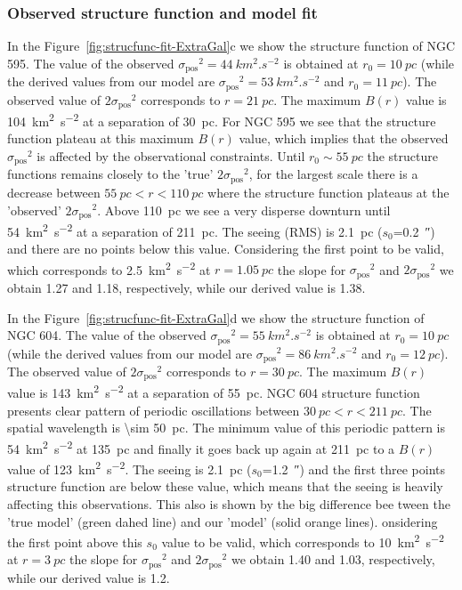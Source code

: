 \documentclass[fleqn,usenatbib, useAMS, a4paper]{mnras}
\newcommand\pos{\ensuremath{_{\mathrm{pos}}}}
\begin{document}
\subsubsection{Observed structure function and model fit}
\label{sec:observ-struct-funct-m33}

In the Figure~\ref{fig:strucfunc-fit-ExtraGal}c we show the structure function of NGC 595.
The value of the observed \(\sigma\pos^2 = \SI{44}{km^{2}.s^{-2}}\) is obtained at \(r_0 = \SI{10}{pc} \) (while the derived values from our model are \(\sigma\pos^2 = \SI{53}{km^{2}.s^{-2}}\) and \(r_0 = \SI{11}{pc} \)).
The observed value of \(2\sigma\pos^2\) corresponds to \(r = \SI{21}{pc} \).
The maximum \(B(r)\) value is \SI{104}{km^{2}.s^{-2}} at a separation of \SI{30}{pc}. 
For NGC 595 we see that the structure function plateau at this maximum \(B(r)\) value, which implies that the observed \(\sigma\pos^2\) is affected by the observational constraints.
Until \(r_0 \sim \SI{55}{pc} \) the structure functions remains closely to the 'true' \(2\sigma\pos^2\), for the largest scale there is a decrease between  \(\SI{55}{pc} < r < \SI{110}{pc} \) where the structure function plateaus at the 'observed' \(2\sigma\pos^2\). 
Above \SI{110}{pc} we see a very disperse downturn  until \SI{54}{km^{2}.s^{-2}} at a separation of \SI{211}{pc}.
The seeing (RMS) is \SI{2.1}{pc} (\(s_0\)=\SI{0.2}{\arcsecond}) and there are no points below this value.
Considering the first point to be valid, which corresponds to \SI{2.5}{km^{2}.s^{-2}} at \(r = \SI{1.05}{pc} \) the slope for \(\sigma\pos^2\) and \(2\sigma\pos^2\) we obtain \num{1.27} and \num{1.18}, respectively, while our derived value is \num{1.38}.

In the Figure~\ref{fig:strucfunc-fit-ExtraGal}d we show the structure function of NGC 604.
The value of the observed \(\sigma\pos^2 = \SI{55}{km^{2}.s^{-2}}\) is obtained at \(r_0 = \SI{10}{pc} \) (while the derived values from our model are \(\sigma\pos^2 = \SI{86}{km^{2}.s^{-2}}\) and \(r_0 = \SI{12}{pc} \)).
The observed value of \(2\sigma\pos^2\) corresponds to \(r = \SI{30}{pc} \).
The maximum \(B(r)\) value is \SI{143}{km^{2}.s^{-2}} at a separation of \SI{55}{pc}. 
NGC 604 structure function presents clear pattern of periodic oscillations between  \(\SI{30}{pc} < r < \SI{211}{pc} \).
The spatial wavelength is \SI{ \sim 50}{pc}. 
The minimum value of this periodic pattern is \SI{54}{km^{2}.s^{-2}} at \SI{135}{pc} 
and finally it goes back up again at \SI{211}{pc} to a \(B(r)\) value of \SI{123}{km^{2}.s^{-2}}.
The seeing is \SI{2.1}{pc} (\(s_0\)=\SI{1.2}{\arcsecond}) and the first three points structure function are below these value, which means that the seeing is heavily affecting this observations.
This also is shown by the big difference bee tween the 'true model' (green dahed line) and our 'model' (solid orange lines).
onsidering the first point above this \(s_0\) value to be valid, which corresponds to \SI{10}{km^{2}.s^{-2}} at \(r = \SI{3}{pc} \) the slope for \(\sigma\pos^2\) and \(2\sigma\pos^2\) we obtain \num{1.40} and \num{1.03}, respectively, while our derived value is \num{1.2}.
\end{document}
